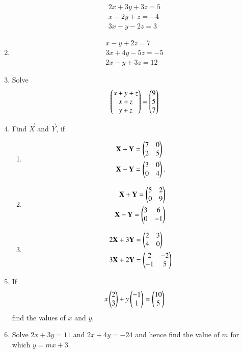 \begin{enumerate}[label=\thesubsection.\arabic*,ref=\thesubsection.\theenumi]
\begin{align}
 2x+3y+3z = 5\\
 x-2y+z = -4\\
 3x-y-2z = 3
\end{align}
\item   \label{prob:14}
\begin{align}
 x-y+2z = 7\\
 3x+4y-5z = -5\\
 2x-y+3z = 12
\end{align}
\item Solve
\begin{align}
\begin{pmatrix}x+y+z \\ x+z \\ y+z \end{pmatrix}=
\begin{pmatrix}9 \\ 5 \\  7\end{pmatrix}
\end{align}
\item Find $\vec{X}$ and $\vec{Y}$, if
\begin{enumerate}
\item 
\begin{align}
	\mathbf{X}+\mathbf{Y}&= \begin{pmatrix}7 & 0 \\ 2 & 5\end{pmatrix} 
\\
		\mathbf{X}-\mathbf{Y}&=\begin{pmatrix}3 & 0 \\ 0 & 4\end{pmatrix}.
\end{align}
\item  
\begin{align}
\mathbf{X}+\mathbf{Y}=\begin{pmatrix}5&2\\0&9\end{pmatrix}
	\\
\mathbf{X}-\mathbf{Y}=\begin{pmatrix}3&6\\0&-1\end{pmatrix}
\end{align}
\item 
\begin{align}
	2\mathbf{X}+3\mathbf{Y}&=\begin{pmatrix}2 & 3 \\ 4 & 0\end{pmatrix}  
	\\
	3\mathbf{X}+2\mathbf{Y}&=\begin{pmatrix}2 & -2 \\ -1 & 5\end{pmatrix}
\end{align}
\end{enumerate}
\item If 
\begin{align}
	x \begin{pmatrix}2 \\ 3\end{pmatrix} + y \begin{pmatrix}-1 \\ 1\end{pmatrix}= \begin{pmatrix}10 \\ 5\end{pmatrix}
\end{align}
find the values of $x$ and $y$.
\item Solve $2x+3y=11$ and $2x+4y=-24$ and hence find the value of $m$ for which $y=mx+3$.

\end{enumerate}
